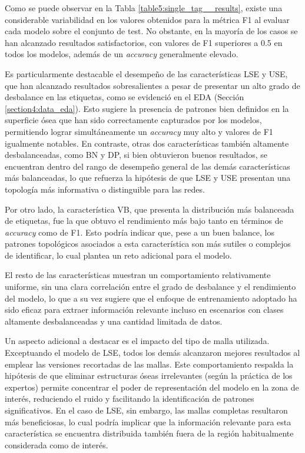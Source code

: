 Como se puede observar en la Tabla \ref{table5:single_tag__results}, existe una considerable variabilidad en los valores obtenidos para la métrica F1 al evaluar cada modelo sobre el conjunto de test. No obstante, en la mayoría de los casos se han alcanzado resultados satisfactorios, con valores de F1 superiores a 0.5 en todos los modelos, además de un \textit{accuracy} generalmente elevado.

Es particularmente destacable el desempeño de las características LSE y USE, que han alcanzado resultados sobresalientes a pesar de presentar un alto grado de desbalance en las etiquetas, como se evidenció en el EDA (Sección \ref{section4:data_eda}). Esto sugiere la presencia de patrones bien definidos en la superficie ósea que han sido correctamente capturados por los modelos, permitiendo lograr simultáneamente un \textit{accuracy} muy alto y valores de F1 igualmente notables. En contraste, otras dos características también altamente desbalanceadas, como BN y DP, si bien obtuvieron buenos resultados, se encuentran dentro del rango de desempeño general de las demás características más balanceadas, lo que refuerza la hipótesis de que LSE y USE presentan una topología más informativa o distinguible para las redes.

Por otro lado, la característica VB, que presenta la distribución más balanceada de etiquetas, fue la que obtuvo el rendimiento más bajo tanto en términos de \textit{accuracy} como de F1. Esto podría indicar que, pese a un buen balance, los patrones topológicos asociados a esta característica son más sutiles o complejos de identificar, lo cual plantea un reto adicional para el modelo.

El resto de las características muestran un comportamiento relativamente uniforme, sin una clara correlación entre el grado de desbalance y el rendimiento del modelo, lo que a su vez sugiere que el enfoque de entrenamiento adoptado ha sido eficaz para extraer información relevante incluso en escenarios con clases altamente desbalanceadas y una cantidad limitada de datos.

Un aspecto adicional a destacar es el impacto del tipo de malla utilizada. Exceptuando el modelo de LSE, todos los demás alcanzaron mejores resultados al emplear las versiones recortadas de las mallas. Este comportamiento respalda la hipótesis de que eliminar estructuras óseas irrelevantes (según la práctica de los expertos) permite concentrar el poder de representación del modelo en la zona de interés, reduciendo el ruido y facilitando la identificación de patrones significativos. En el caso de LSE, sin embargo, las mallas completas resultaron más beneficiosas, lo cual podría implicar que la información relevante para esta característica se encuentra distribuida también fuera de la región habitualmente considerada como de interés.

